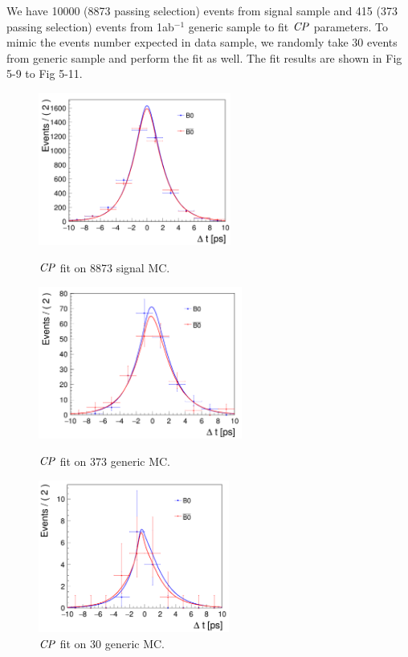 We have 10000 (8873 passing selection) events from signal sample and 415 (373 passing selection) events from 1ab$^{-1}$ generic sample to fit $\it{CP}$ parameters. To mimic the events number expected in data sample, we randomly take 30 events from generic sample and perform the fit as well. The fit results are shown in Fig 5-9 to Fig 5-11. 
\begin{figure}[H]
	\begin{minipage}{0.5\linewidth}
		\includegraphics[height=5cm]{figures/cpfit-10000sig}
		\caption{$\it{CP}$ fit on 8873 signal MC.}
	\end{minipage}
	\begin{minipage}{0.5\linewidth}
		\includegraphics[height=5cm]{figures/cpfit-373gen}
		\caption{$\it{CP}$ fit on 373 generic MC.}
	\end{minipage}
	\begin{minipage}{0.5\linewidth}
		\includegraphics[height=5cm]{figures/cpfit-30gen}
		\caption{$\it{CP}$ fit on 30 generic MC.}
	\end{minipage}
\end{figure}

